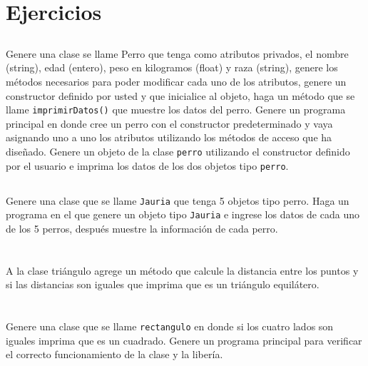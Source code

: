 \documentclass[12pt]{extarticle}
\newcommand{\<}{\langle}
\renewcommand{\>}{\rangle}
\theoremstyle{definition}
\begin{document}
\section{Ejercicios}
\subsection{} Genere una clase se llame Perro que tenga como atributos privados, el nombre (string), edad (entero), peso en kilogramos (float) y raza (string), genere los métodos necesarios para poder modificar cada uno de los atributos, genere un constructor definido por usted y que inicialice al objeto, haga un método que se llame \verb|imprimirDatos()| que muestre los datos del perro. 
Genere un programa principal en donde cree un perro con el constructor predeterminado y vaya asignando uno a uno los atributos utilizando los métodos de acceso que ha diseñado. 
Genere un objeto de la clase \verb|perro| utilizando el constructor definido por el usuario e imprima los datos de los dos objetos tipo \verb|perro|.

\subsection{}
Genere una clase que se llame \verb|Jauria| que tenga 5 objetos tipo perro. Haga un programa en el que genere un objeto tipo \verb|Jauria| e ingrese los datos de cada uno de los 5 perros,  después muestre la información de cada perro. 


\section{}
A la clase triángulo agrege un método que calcule la distancia entre los puntos y si las distancias son iguales que imprima que es un triángulo equilátero. 


\section{}
Genere una clase que se llame \verb|rectangulo| en donde si los cuatro lados son iguales imprima que es un cuadrado. Genere un programa principal para verificar el correcto funcionamiento de la clase y la libería.
\end{document}
